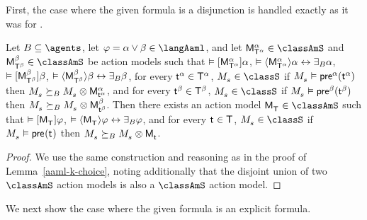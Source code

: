 First, the case where the given formula is a disjunction is handled exactly as it was for \logicAamlK{}.

\begin{lemma}\label{aaml-s5-choice}
Let $\agentsB \subseteq \agents$, 
let $\phi = \alpha \lor \beta \in \langAaml$, and 
let $\aPModel[\alpha]{\aStatesT[\alpha]} \in \classAmS$ and $\aPModel[\beta]{\aStatesT[\beta]} \in \classAmS$ be action models such that 
$\entails \actionA{\aPModel[\alpha]{\aStatesT[\alpha]}} \alpha$, 
$\entails \actionE{\aPModel[\alpha]{\aStatesT[\alpha]}} \alpha \iff \someactsBs \alpha$, 
$\entails \actionA{\aPModel[\beta]{\aStatesT[\beta]}} \beta$,
$\entails \actionE{\aPModel[\beta]{\aStatesT[\beta]}} \beta \iff \someactsBs \beta$,
for every $\aStateT[\alpha] \in \aStatesT[\alpha]$, $\kPModel{\kStateS} \in \classS$ if $\kPModel{\kStateS} \entails \aPrecondition[\alpha](\aStateT[\alpha])$ then $\kPModel{\kStateS} \simulatesBs \kPModel{\kStateS} \exec \aPModel[\alpha]{\aStateT[\alpha]}$, and
for every $\aStateT[\beta] \in \aStatesT[\beta]$, $\kPModel{\kStateS} \in \classS$ if $\kPModel{\kStateS} \entails \aPrecondition[\beta](\aStateT[\beta])$ then $\kPModel{\kStateS} \simulatesBs \kPModel{\kStateS} \exec \aPModel[\beta]{\aStateT[\beta]}$.
Then there exists an action model $\aPModel{\aStatesT} \in \classAmS$ such that 
$\entails \actionA{\aPModel{\aStatesT}} \phi$,
$\entails \actionE{\aPModel{\aStatesT}} \phi \iff \someactsBs \phi$, and
for every $\aStateT \in \aStatesT$, $\kPModel{\kStateS} \in \classS$ if $\kPModel{\kStateS} \entails \aPrecondition(\aStateT)$ then $\kPModel{\kStateS} \simulatesBs \kPModel{\kStateS} \exec \aPModel{\aStateT}$.
\end{lemma}

\begin{proof}[Proof]
We use the same construction and reasoning as in the proof of Lemma~\ref{aaml-k-choice}, noting additionally that the disjoint union of two $\classAmS$ action models is also a $\classAmS$ action model.
\end{proof}

We next show the case where the given formula is an explicit formula.

